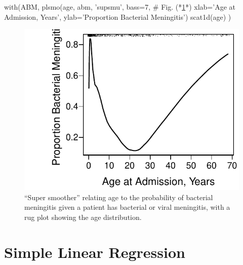 \begin{Schunk}
\begin{Sinput}
with(ABM, {
  plsmo(age, abm, 'supsmu', bass=7,     # Fig. (*\ref{fig:reg-age-abm}*)
        xlab='Age at Admission, Years',
        ylab='Proportion Bacterial Meningitis')
  scat1d(age) })
\end{Sinput}
\begin{figure}[htbp]

\centerline{\includegraphics[width=\maxwidth]{reg-age-abm-1} }

\caption[Example of super smoother]{``Super smoother'' relating age to the probability of bacterial meningitis given a patient has bacterial or viral meningitis, with a rug plot showing the age distribution.}\label{fig:reg-age-abm}
\end{figure}
\end{Schunk}
\clearpage

\def\apacue{1}
\section{Simple Linear Regression}%

